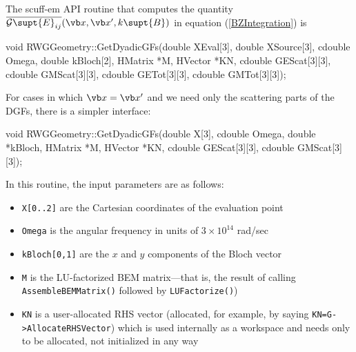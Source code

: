 \documentclass[letterpaper]{article}
\begin{document}
The {\sc scuff-em} API routine that computes the quantity
$\overline{\mathcal{G}\supt{E}_{ij}}(\vb x, \vb x^\prime, k\supt{B})$
in equation (\ref{BZIntegration}) is 

\smallskip 
\begin{center}
\begin{verbcode}
void RWGGeometry::GetDyadicGFs(double XEval[3], double XSource[3],
                               cdouble Omega, double kBloch[2],
                               HMatrix *M, HVector *KN,
                               cdouble GEScat[3][3],
                               cdouble GMScat[3][3],
                               cdouble GETot[3][3],
                               cdouble GMTot[3][3]);
\end{verbcode}
\end{center}
\smallskip

For cases in which $\vb x=\vb x^\prime$ and we need only the 
scattering parts of the DGFs, there is a simpler interface:

\smallskip 
\begin{center}
\begin{verbcode}
void RWGGeometry::GetDyadicGFs(double X[3], cdouble Omega, 
                               double *kBloch,
                               HMatrix *M, HVector *KN,
                               cdouble GEScat[3][3], 
                               cdouble GMScat[3][3]);
\end{verbcode}
\end{center}
\smallskip 

In this routine, the input parameters are as follows:

\begin{itemize}
 \item \texttt{X[0..2]} are the Cartesian coordinates of the evaluation point
 \item \texttt{Omega} is the angular frequency in units of $3\times 10^{14}$ rad/sec
 \item \texttt{kBloch[0,1]} are the $x$ and $y$ components of the Bloch vector
 \item \texttt{M} is the LU-factorized BEM matrix---that is, the result of 
       calling \texttt{AssembleBEMMatrix()} followed by \texttt{LUFactorize()})
 \item \texttt{KN} is a user-allocated RHS vector (allocated, for example,
       by saying \texttt{KN=G->AllocateRHSVector}) which is used internally
       as a workspace and needs only to be allocated, not initialized in any way
\end{itemize}
\end{document}
